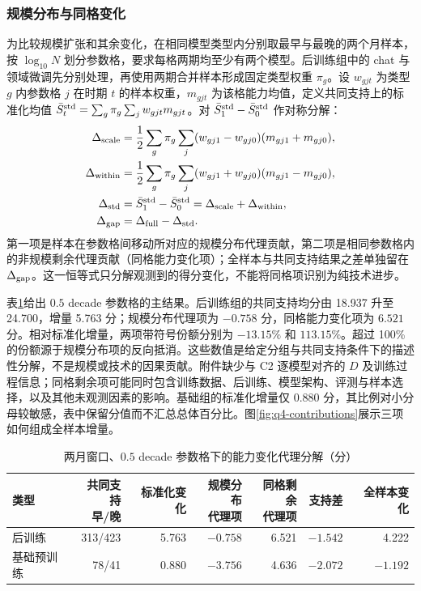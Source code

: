\subsubsection{规模分布与同格变化}

为比较规模扩张和其余变化，在相同模型类型内分别取最早与最晚的两个月样本，按 $\log_{10}N$ 划分参数格，要求每格两期均至少有两个模型。后训练组中的 chat 与领域微调先分别处理，再使用两期合并样本形成固定类型权重 $\pi_g$。设 $w_{gjt}$ 为类型 $g$ 内参数格 $j$ 在时期 $t$ 的样本权重，$m_{gjt}$ 为该格能力均值，定义共同支持上的标准化均值 $\bar S_t^{\rm std}=\sum_g\pi_g\sum_jw_{gjt}m_{gjt}$。对 $\bar S_1^{\rm std}-\bar S_0^{\rm std}$ 作对称分解：
\begin{align}
 \Delta_{\rm scale}
 &=\frac12\sum_g\pi_g\sum_j(w_{gj1}-w_{gj0})(m_{gj1}+m_{gj0}),
 \label{eq:q4-scale-term}\\
 \Delta_{\rm within}
 &=\frac12\sum_g\pi_g\sum_j(w_{gj1}+w_{gj0})(m_{gj1}-m_{gj0}),
 \label{eq:q4-within-term}\\
 \Delta_{\rm std}&=\bar S_1^{\rm std}-\bar S_0^{\rm std}=\Delta_{\rm scale}+\Delta_{\rm within},\nonumber\\
 \Delta_{\rm gap}&=\Delta_{\rm full}-\Delta_{\rm std}.
 \label{eq:q4-gap}
\end{align}
第一项是样本在参数格间移动所对应的规模分布代理贡献，第二项是相同参数格内的非规模剩余代理贡献（同格能力变化项）；全样本与共同支持结果之差单独留在 $\Delta_{\rm gap}$。这一恒等式只分解观测到的得分变化，不能将同格项识别为纯技术进步。

表\ref{tab:q4-decomp}给出 $0.5$ decade 参数格的主结果。后训练组的共同支持均分由 18.937 升至 24.700，增量 5.763 分；规模分布代理项为 $-0.758$ 分，同格能力变化项为 $6.521$ 分。相对标准化增量，两项带符号份额分别为 $-13.15\%$ 和 $113.15\%$。超过 100\% 的份额源于规模分布项的反向抵消。这些数值是给定分组与共同支持条件下的描述性分解，不是规模或技术的因果贡献。附件缺少与 C2 逐模型对齐的 $D$ 及训练过程信息；同格剩余项可能同时包含训练数据、后训练、模型架构、评测与样本选择，以及其他未观测因素的影响。基础组的标准化增量仅 0.880 分，其比例对小分母较敏感，表中保留分值而不汇总总体百分比。图\ref{fig:q4-contributions}展示三项如何组成全样本增量。

\begin{table}[htbp]
 \centering\small
 \caption{两月窗口、$0.5$ decade 参数格下的能力变化代理分解（分）}
 \label{tab:q4-decomp}
 \begin{tabular}{lrrrrrr}
 \toprule
 类型 & \makecell{共同支持\\早/晚} & 标准化变化 & \makecell{规模分布\\代理项} & \makecell{同格剩余\\代理项} & 支持差 & 全样本变化\\
 \midrule
 后训练 & 313/423 & 5.763 & $-0.758$ & 6.521 & $-1.542$ & 4.222\\
 基础预训练 & 78/41 & 0.880 & $-3.756$ & 4.636 & $-2.072$ & $-1.192$\\
 \bottomrule
 \end{tabular}
\end{table}

